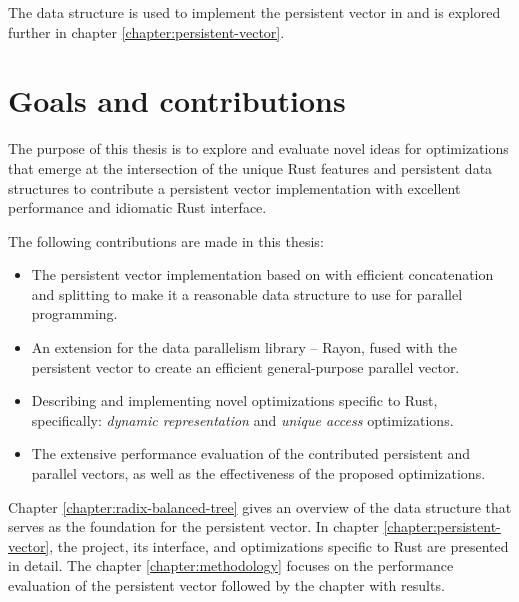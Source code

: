 The \treerrb{} data structure is used to implement the persistent vector in \pvecrs{} and is explored further in chapter \ref{chapter:persistent-vector}.

\section{Goals and contributions}
\label{sec:contributions}
The purpose of this thesis is to explore and evaluate novel ideas for optimizations that emerge at the intersection of the unique Rust features and persistent data structures to contribute a persistent vector implementation with excellent performance and idiomatic Rust interface.

The following contributions are made in this thesis:
\begin{itemize}
    \item The persistent vector implementation based on \treerrb{} with efficient concatenation and splitting to make it a reasonable data structure to use for parallel programming.
    \item An extension for the data parallelism library -- Rayon, fused with the persistent vector to create an efficient general-purpose parallel vector.
    \item Describing and implementing novel optimizations specific to Rust, specifically: \emph{dynamic representation} and \emph{unique access} optimizations.
    \item The extensive performance evaluation of the contributed persistent and parallel vectors, as well as the effectiveness of the proposed optimizations.
\end{itemize}

Chapter \ref{chapter:radix-balanced-tree} gives an overview of the \treerrb{} data structure that serves as the foundation for the persistent vector. In chapter \ref{chapter:persistent-vector}, the \pvecrs{} project, its interface, and optimizations specific to Rust are presented in detail. The chapter \ref{chapter:methodology} focuses on the performance evaluation of the persistent vector followed by the chapter with results.
